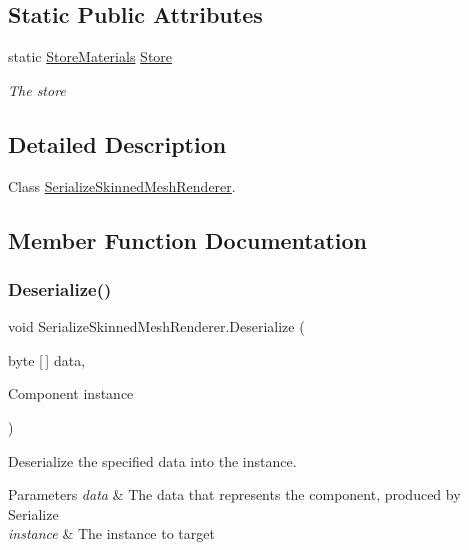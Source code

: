 \subsection*{Static Public Attributes}
\begin{DoxyCompactItemize}
\item 
static \hyperlink{class_serialization_1_1_store_materials}{Store\+Materials} \hyperlink{class_serialize_skinned_mesh_renderer_aea00be7a265b75c63258cfbf9b0b3b79}{Store}
\begin{DoxyCompactList}\small\item\em The store \end{DoxyCompactList}\end{DoxyCompactItemize}


\subsection{Detailed Description}
Class \hyperlink{class_serialize_skinned_mesh_renderer}{Serialize\+Skinned\+Mesh\+Renderer}. 



\subsection{Member Function Documentation}
\mbox{\label{class_serialize_skinned_mesh_renderer_ae689a9e0a41aa23ec86f46bffa56b7b5}} 
\subsubsection{\texorpdfstring{Deserialize()}{Deserialize()}}
{\footnotesize\ttfamily void Serialize\+Skinned\+Mesh\+Renderer.\+Deserialize (\begin{DoxyParamCaption}\item[{byte \mbox{[}$\,$\mbox{]}}]{data,  }\item[{Component}]{instance }\end{DoxyParamCaption})\hspace{0.3cm}{\ttfamily [inline]}}



Deserialize the specified data into the instance. 


\begin{DoxyParams}{Parameters}
{\em data} & The data that represents the component, produced by Serialize\\
\hline
{\em instance} & The instance to target\\
\hline
\end{DoxyParams}


